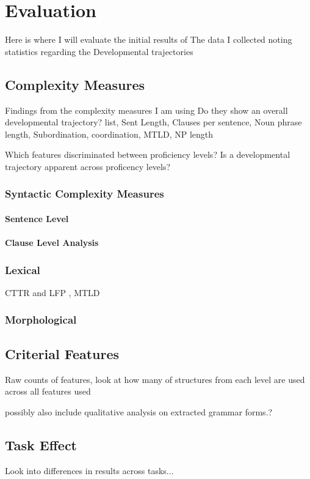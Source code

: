 \chapter{Evaluation} 
Here is where I will evaluate the initial results of The data I collected noting statistics regarding the Developmental
trajectories
\section{Complexity Measures}

Findings from the complexity measures I am using
Do they show an overall developmental trajectory?
list, Sent Length, Clauses per sentence, Noun phrase length,  Subordination, coordination, MTLD, NP length

Which features discriminated between proficiency levels?
Is a developmental trajectory apparent across proficency levels?

\subsection{Syntactic Complexity Measures}
\subsubsection{Sentence Level}


\subsubsection{Clause Level Analysis}

\subsection{Lexical}
CTTR and LFP , MTLD

\subsection{Morphological}


\section{Criterial Features}
Raw counts of features, 
look at how many of structures from each level are used across all features used


possibly also include qualitative analysis on extracted grammar forms.?

\section{Task Effect}
Look into differences in results across tasks...